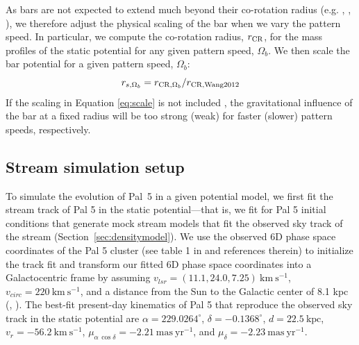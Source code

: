 \documentclass[twocolumn]{aastex62}
\newcommand{\msun}{\textrm{M}_\odot}
\newcommand{\kpc}{\textrm{kpc}}
\newcommand{\kms}{\ensuremath{\textrm{km}~\textrm{s}^{-1}}}
\newcommand{\masyr}{\ensuremath{\textrm{mas}~\textrm{yr}^{-1}}}
\newcommand{\todo}[1]{{\color{red} TODO: #1}}
\begin{document}
As bars are not expected to extend much beyond their co-rotation radius (e.g. \citealt{Debattista:2002}, \citealt{Debattista:2002b}, \citealt{weiner:1999}), we therefore adjust the physical scaling of the bar when we vary the pattern speed. %
In particular, we compute the co-rotation radius, $r_{\rm CR}$, for the mass profiles of the static potential for any given pattern speed, $\Omega_b$.
We then scale the bar potential for a given pattern speed, $\Omega_b$:
\begin{equation}\label{eq:scale}
r_{s, \Omega_b}  = r_{{\rm CR}, \Omega_b}/r_{{\rm CR, Wang 2012}}
\end{equation}
If the scaling in Equation \ref{eq:scale} is not included \citep[as in, e.g.,][]{Pearson:2017, Erkal:2017, Banik:2019}, the gravitational influence of the bar at a fixed radius will be too strong (weak) for faster (slower) pattern speeds, respectively.

%


\subsection{Stream simulation setup}
\label{sec:modeling}

To simulate the evolution of Pal~5 in a given potential model, we first fit the stream track of Pal 5 in the static potential---that is, we fit for Pal 5 initial conditions that generate mock stream models that fit the observed sky track of the stream (Section~\ref{sec:densitymodel}).
We use the observed 6D phase space coordinates of the Pal 5 cluster (see table 1 in \citealt{Pearson:2017} and references therein) to initialize the track fit and transform our fitted 6D phase space coordinates into a Galactocentric frame by assuming $v_{lsr} = (11.1, 24.0, 7.25) ~\kms$,  $v_{circ} = 220~\kms$, and a distance from the Sun to the Galactic center of 8.1 kpc (\citealt{Schonrich:2010}, \citealt{Schonrich:2012}). 
The best-fit present-day kinematics of Pal 5 that reproduce the observed sky track in the static potential are $\alpha = 229.0264^\circ$, $\delta = -0.1368^\circ$, $d = 22.5~\kpc$, $v_r = -56.2~\kms$, $\mu_{\alpha\,\cos\delta} = -2.21~\masyr$, and $\mu_\delta = -2.23~\masyr$.
\end{document}
